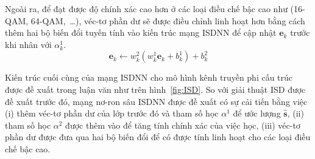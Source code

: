 Ngoài ra, để đạt được độ chính xác cao hơn ở các loại điều chế bậc cao như (16-QAM, 64-QAM,~\ldots), véc-tơ phần dư sẽ được điều chỉnh linh hoạt hơn bằng cách thêm hai bộ biến đổi tuyến tính vào kiến trúc mạng ISDNN để cập nhật $\mathbf{e}_k$ trước khi nhân với $\alpha^1_k$.
\begin{equation}
\mathbf{e}_k \leftarrow w^2_{k}\left(w^1_{k} \mathbf{e}_k+b^1_{k}\right)+b^2_{k}
\end{equation}

Kiến trúc cuối cùng của mạng ISDNN cho mô hình kênh truyền phi cấu trúc được đề xuất trong luận văn như trên hình~\ref{fig:ISD}. So với giải thuật ISD được đề xuất trước đó, mạng nơ-ron sâu ISDNN được đề xuất có sự cải tiến bằng việc (i) thêm véc-tơ phần dư của lớp trước đó và tham số học $\alpha^1$ để ước lượng $\hat{\mathbf{s}}$, (ii) tham số học $\alpha^2$ được thêm vào để tăng tính chính xác của việc học, (iii) véc-tơ phần dư được đưa qua hai bộ biến đổi để có được tính linh hoạt cho các loại điều chế bậc cao.
